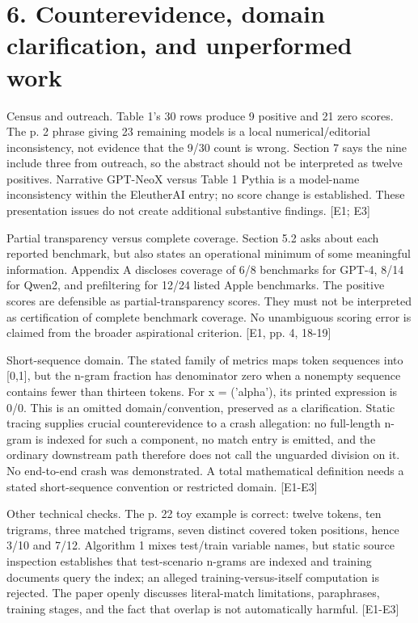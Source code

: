 \documentclass[10pt]{article}
\begin{document}
\section*{6. Counterevidence, domain clarification, and unperformed work}
Census and outreach. Table 1’s 30 rows produce 9 positive and 21 zero scores. The p. 2 phrase giving 23 remaining models is a local numerical/editorial inconsistency, not evidence that the 9/30 count is wrong. Section 7 says the nine include three from outreach, so the abstract should not be interpreted as twelve positives. Narrative GPT-NeoX versus Table 1 Pythia is a model-name inconsistency within the EleutherAI entry; no score change is established. These presentation issues do not create additional substantive findings. [E1; E3]\par
Partial transparency versus complete coverage. Section 5.2 asks about each reported benchmark, but also states an operational minimum of some meaningful information. Appendix A discloses coverage of 6/8 benchmarks for GPT-4, 8/14 for Qwen2, and prefiltering for 12/24 listed Apple benchmarks. The positive scores are defensible as partial-transparency scores. They must not be interpreted as certification of complete benchmark coverage. No unambiguous scoring error is claimed from the broader aspirational criterion. [E1, pp. 4, 18-19]\par
Short-sequence domain. The stated family of metrics maps token sequences into [0,1], but the n-gram fraction has denominator zero when a nonempty sequence contains fewer than thirteen tokens. For x = (’alpha’), its printed expression is 0/0. This is an omitted domain/convention, preserved as a clarification. Static tracing supplies crucial counterevidence to a crash allegation: no full-length n-gram is indexed for such a component, no match entry is emitted, and the ordinary downstream path therefore does not call the unguarded division on it. No end-to-end crash was demonstrated. A total mathematical definition needs a stated short-sequence convention or restricted domain. [E1-E3]\par
Other technical checks. The p. 22 toy example is correct: twelve tokens, ten trigrams, three matched trigrams, seven distinct covered token positions, hence 3/10 and 7/12. Algorithm 1 mixes test/train variable names, but static source inspection establishes that test-scenario n-grams are indexed and training documents query the index; an alleged training-versus-itself computation is rejected. The paper openly discusses literal-match limitations, paraphrases, training stages, and the fact that overlap is not automatically harmful. [E1-E3]\par
\end{document}
